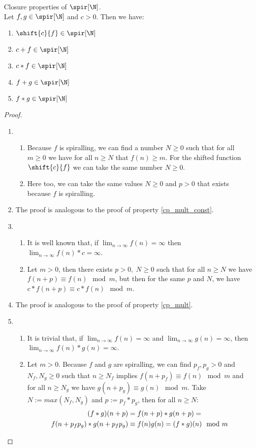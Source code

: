 \begin{theorem}{Closure properties of $\spir[\N]$.}\label{cp_spir}\\
Let $f,g\in\spir[\N]$ and $c>0$. Then we have:
\begin{enumerate}
	\item $\shift{c}{f}\in\spir[\N]$ \label{cp_shift}
	\item $c+f\in\spir[\N]$ \label{cp_add_const}
	\item $c*f\in\spir[\N]$ \label{cp_mult_const}
	\item $f+g\in\spir[\N]$ \label{cp_add}
	\item $f*g\in\spir[\N]$ \label{cp_mult}
\end{enumerate}

\begin{proof}
\hfill
\begin{enumerate}
	\item 
	\begin{enumerate}
		\item Because $f$ is spiralling, we can find a number $N\geq0$ such that for all $m\geq 0$ we have for all $n\geq N$ that $f(n) \geq m$. For the shifted function $\shift{c}{f}$ we can take the same number $N\geq0$.
		\item Here too, we can take the same values $N\geq0$ and $p>0$ that exists because $f$ is spiralling.
	\end{enumerate}
	\item The proof is analogous to the proof of property \ref{cp_mult_const}.
	\item 
		\begin{enumerate}
			\item It is well known that, if $\lim_{n\to\infty}f(n)=\infty$ then $\lim_{n\to\infty}f(n)*c=\infty$.
			\item Let $m>0$, then there exists $p>0,\;N\geq0$ such that for all $n\geq N$ we have $f(n+p) \equiv f(n) \mod m$, but then for the same $p$ and $N$, we have $c*f(n+p) \equiv c*f(n) \mod m$.
		\end{enumerate}
	\item The proof is analogous to the proof of property \ref{cp_mult}.
	\item 
		\begin{enumerate}
			\item It is trivial that, if $\lim_{n\to\infty}f(n)=\infty$ and $\lim_{n\to\infty}g(n)=\infty$, then $\lim_{n\to\infty}f(n)*g(n)=\infty$.
			\item Let $m>0$. Because $f$ and $g$ are spiralling, we can find $p_f,p_g>0$ and $N_f,N_g\geq0$ such that $n\geq N_f $ implies $f(n+p_f) \equiv f(n) \mod m$ and for all $n\geq N_g $ we have $g(n+p_g) \equiv g(n) \mod m$. Take $N:=max(N_f,N_g)$ and $p:=p_f*p_g$, then for all $n\geq N$:
			\begin{align*}
				(f*g)(n+p) &= f(n+p)*g(n+p) = \\
				f(n+p_fp_g)*g(n+p_fp_g) &\equiv f(n)g(n) = (f*g)(n) \mod m \qedhere\\
			\end{align*}
		\end{enumerate}
\end{enumerate}
\end{proof}
\end{theorem}
